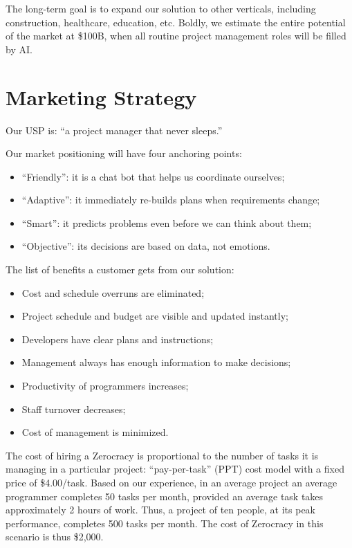 \documentclass{main}
\begin{document}
The long-term goal is to expand our solution to other verticals, including
construction, healthcare, education, etc. Boldly, we estimate the entire
potential of the market at \$100B, when all routine project management roles will
be filled by AI.

\section{Marketing Strategy}

Our USP is: ``a project manager that never sleeps.''

Our market positioning will have four anchoring points:

\begin{itemize}\itemsep0em
  \item ``Friendly'': it is a chat bot that helps us coordinate ourselves;
  \item ``Adaptive'': it immediately re-builds plans when requirements change;
  \item ``Smart'': it predicts problems even before we can think about them;
  \item ``Objective'': its decisions are based on data, not emotions.
\end{itemize}

The list of benefits a customer gets from our solution:

\begin{itemize}\itemsep0em
  \item Cost and schedule overruns are eliminated;
  \item Project schedule and budget are visible and updated instantly;
  \item Developers have clear plans and instructions;
  \item Management always has enough information to make decisions;
  \item Productivity of programmers increases;
  \item Staff turnover decreases;
  \item Cost of management is minimized.
\end{itemize}

The cost of hiring a Zerocracy is proportional to the number of tasks it is
managing in a particular project: ``pay-per-task'' (PPT) cost model with
a fixed price of \$4.00/task. Based on our experience, in an average project an average
programmer completes 50 tasks per month, provided an average task takes
approximately 2 hours of work. Thus, a project of ten people, at its peak
performance, completes 500 tasks per month. The cost of Zerocracy in this
scenario is thus \$2,000.
\end{document}
